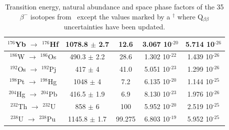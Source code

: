 \documentclass[main.tex]{subfiles}
\begin{document}
\begin{table}
\begin{tabular}{|c|c|c|c|c|}
\hline
$^{\text{176}}$Yb $\rightarrow$ $^{\text{176}}$Hf & 1078.8 $\pm$ 2.7 & 12.6   & 3.067 10$^{\text{-20}}$ & 5.714 10$^{\text{-26}}$\\ 
\hline
$^{\text{186}}$W $\rightarrow$ $^{\text{186}}$Os & 490.3   $\pm$ 2.2 & 28.6   & 1.302 10$^{\text{-22}}$ & 1.439 10$^{\text{-26}}$\\ 
\hline
$^{\text{192}}$Os $\rightarrow$ $^{\text{192}}$Pj & 417    $\pm$ 4   & 41.0   & 5.051 10$^{\text{-23}}$ & 1.299 10$^{\text{-26}}$\\ 
\hline 
$^{\text{198}}$Pt $\rightarrow$ $^{\text{198}}$Hg & 1048   $\pm$ 4   & 7.2    & 6.135 10$^{\text{-20}}$ & 1.144 10$^{\text{-25}}$\\
\hline 
$^{\text{204}}$Hg $\rightarrow$ $^{\text{204}}$Pb & 416.5  $\pm$ 1.9 & 6.9    & 8.130 10$^{\text{-23}}$ & 1.976 10$^{\text{-26}}$\\
\hline 
$^{\text{232}}$Th $\rightarrow$ $^{\text{232}}$U & 858     $\pm$ 6   & 100    & 5.952 10$^{\text{-20}}$ & 2.519 10$^{\text{-25}}$\\
\hline 
$^{\text{238}}$U $\rightarrow$ $^{\text{238}}$Pu & 1145.8  $\pm$ 1.7 & 99.275 & 6.803 10$^{\text{-19}}$ & 5.952 10$^{\text{-25}}$\\ 
\hline
\end{tabular}
\caption{Transition energy, natural abundance and space phase factors of the 35 $\beta^{-}$ isotopes from~\cite{ParameterBBisotopes} except the values marked by a $^{\dagger}$ where Q$_{\beta\beta}$ uncertainties have been updated.}
\label{tab:2nuIsotopes}
\end{table}


\FloatBarrier
\end{document}

